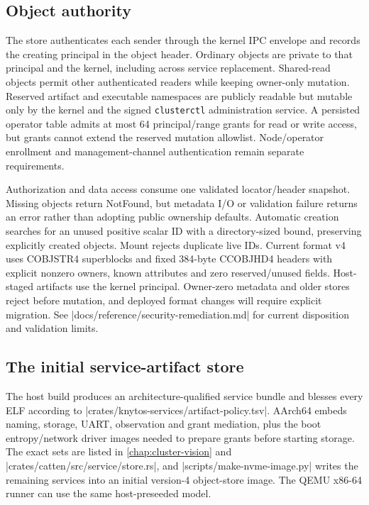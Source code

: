 \subsection{Object authority}

The store authenticates each sender through the kernel IPC envelope and records
the creating principal in the object header. Ordinary objects are private to
that principal and the kernel, including across service replacement. Shared-read
objects permit other authenticated readers while keeping owner-only mutation.
Reserved artifact and executable namespaces are publicly readable but mutable
only by the kernel and the signed \texttt{clusterctl} administration service.
A persisted operator table admits at most 64 principal/range grants for read or
write access, but grants cannot extend the reserved mutation allowlist. Node/operator
enrollment and management-channel authentication remain separate requirements.

Authorization and data access consume one validated locator/header snapshot.
Missing objects return NotFound, but metadata I/O or validation failure returns an
error rather than adopting public ownership defaults. Automatic creation searches
for an unused positive scalar ID with a directory-sized bound, preserving
explicitly created objects. Mount rejects duplicate live IDs. Current format
v4 uses COBJSTR4 superblocks and fixed 384-byte CCOBJHD4 headers with explicit
nonzero owners, known attributes and zero reserved/unused fields. Host-staged
artifacts use the kernel principal. Owner-zero metadata and older stores reject
before mutation, and deployed format changes will require explicit migration.
See \repofile|docs/reference/security-remediation.md| for current disposition
and validation limits.

\subsection{The initial service-artifact store}

The host build produces an architecture-qualified service bundle and blesses
every ELF according to
\repofile|crates/knytos-services/artifact-policy.tsv|. AArch64 embeds naming,
storage, UART, observation and grant mediation, plus the boot entropy/network
driver images needed to prepare grants before starting storage. The exact sets
are listed in \autoref{chap:cluster-vision} and
\repofile|crates/catten/src/service/store.rs|, and
\repofile|scripts/make-nvme-image.py| writes the remaining
services into an initial version-4 object-store image. The QEMU x86-64 runner
can use the same host-preseeded model.

